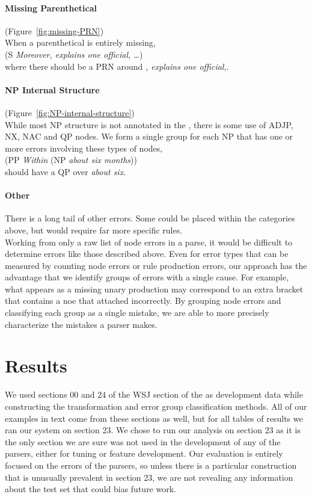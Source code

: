 \paragraph{Missing Parenthetical} (Figure~\ref{fig:missing-PRN}) \\
When a parenthetical is entirely missing, \myeg \\
(S \emph{Moreover, explains one official, \ldots}) \\
where there should be a PRN around \emph{, explains one official,}.

\paragraph{NP Internal Structure} (Figure~\ref{fig:NP-internal-structure}) \\
While most NP structure is not annotated in the \ptb, there is some use of ADJP, NX, NAC and QP nodes.
We form a single group for each NP that has one or more errors involving these types of nodes, \myeg \\
(PP \emph{Within} (NP \emph{about six months})) \\
should have a QP over \emph{about six}.

\paragraph{Other}
There is a long tail of other errors.
Some could be placed within the categories above, but would require far more specific rules. \\

Working from only a raw list of node errors in a parse, it would be difficult to determine errors like those described above.
Even for error types that can be measured by counting node errors or rule production errors, our approach has the advantage that we identify groups of errors with a single cause.
For example, what appears as a missing unary production may correspond to an extra bracket that contains a noe that attached incorrectly.
By grouping node errors and classifying each group as a single mistake, we are able to more precisely characterize the mistakes a parser makes.

\section{Results} \label{sec:errors-results}

We used sections 00 and 24 of the WSJ section of the \ptb as development data while constructing the transformation and error group classification methods.
All of our examples in text come from these sections as well, but for all tables of results we ran our system on section 23.
We chose to run our analysis on section 23 as it is the only section we are sure was not used in the development of any of the parsers, either for tuning or feature development.
Our evaluation is entirely focused on the errors of the parsers, so unless there is a particular construction that is unusually prevalent in section 23, we are not revealing any information about the test set that could bias future work.

